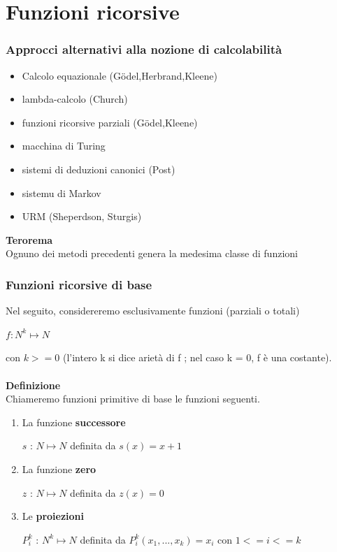 \chapter{Funzioni ricorsive} \label{ch:capitolo8}
\subsection{Approcci alternativi alla nozione di calcolabilità}
\begin{itemize}
    \item Calcolo equazionale (Gödel,Herbrand,Kleene)
    
    \item lambda-calcolo (Church)
    
    \item funzioni ricorsive parziali (Gödel,Kleene)
    
    \item macchina di Turing
    
    \item sistemi di deduzioni canonici (Post)
    
    \item sistemu di Markov
    
    \item URM (Sheperdson, Sturgis)
\end{itemize}
\textbf{Terorema}\\
Ognuno dei metodi precedenti genera la medesima classe di funzioni
\newpage
\subsection{Funzioni ricorsive di base}
Nel seguito, considereremo esclusivamente funzioni (parziali o totali)
\begin{center}
    $f : N^k \mapsto N$
\end{center}
con $k >= 0$ (l’intero k si dice arietà di f ; nel caso k = 0, f è una costante).\\\\
\textbf{Definizione}\\
Chiameremo funzioni primitive di base le funzioni seguenti.
\begin{enumerate}
    \item La funzione \textbf{successore}
    \begin{center}
        $s$ : $N \mapsto N$ definita da $s(x) = x + 1$
    \end{center}
    \item La funzione \textbf{zero}
    \begin{center}
         $z$ : $N \mapsto N$ definita da $z(x) = 0$
    \end{center}
    \item Le \textbf{proiezioni} 
    \begin{center}
        $P^k_i $ : $N^k \mapsto N $ definita da $P^k_i(x_1,...,x_k) = x_i$ con $1 <= i <= k$
    \end{center}
\end{enumerate}
